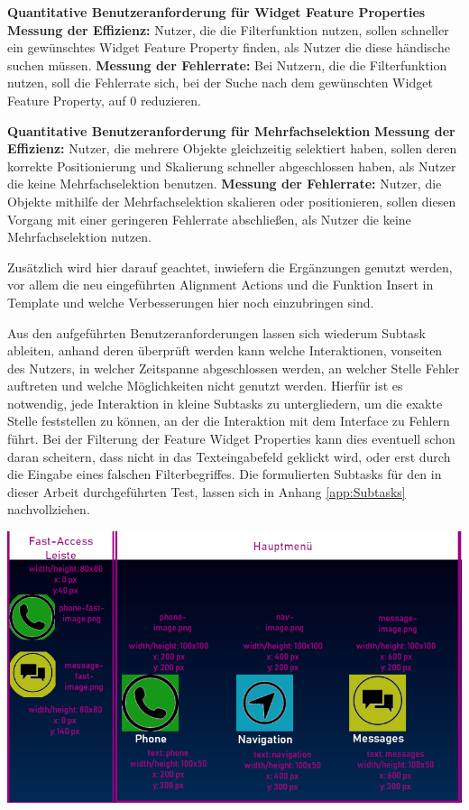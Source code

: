\textbf{Quantitative Benutzeranforderung für Widget Feature Properties} \newline
\textbf{Messung der Effizienz:}
Nutzer, die die Filterfunktion nutzen, sollen schneller ein gewünschtes Widget Feature Property finden, als Nutzer die diese händische suchen müssen. \newline
\textbf{Messung der Fehlerrate:}
Bei Nutzern, die die Filterfunktion nutzen, soll die Fehlerrate sich, bei der Suche nach dem gewünschten Widget Feature Property, auf 0 reduzieren.

\textbf{Quantitative Benutzeranforderung für Mehrfachselektion}\newline
\textbf{Messung der Effizienz:}
Nutzer, die mehrere Objekte gleichzeitig selektiert haben, sollen deren korrekte Positionierung  und Skalierung schneller abgeschlossen haben, als Nutzer die keine Mehrfachselektion benutzen.\newline
\textbf{Messung der Fehlerrate:}
Nutzer, die Objekte mithilfe der Mehrfachselektion skalieren oder positionieren, sollen diesen Vorgang mit einer geringeren Fehlerrate abschließen, als Nutzer die keine Mehrfachselektion nutzen.

Zusätzlich wird hier darauf geachtet, inwiefern die Ergänzungen genutzt werden, vor allem die neu eingeführten \glqq Alignment Actions\grqq{} und die Funktion \glqq Insert in Template\grqq{} und welche Verbesserungen hier noch einzubringen sind.

Aus den aufgeführten Benutzeranforderungen lassen sich wiederum Subtask ableiten, anhand deren überprüft werden kann welche Interaktionen, vonseiten des Nutzers, in welcher Zeitspanne abgeschlossen werden, an welcher Stelle Fehler auftreten und welche Möglichkeiten nicht genutzt werden.
Hierfür ist es notwendig, jede Interaktion in kleine Subtasks zu untergliedern, um die exakte Stelle feststellen zu können, an der die Interaktion mit dem Interface zu Fehlern führt.
Bei der Filterung der Feature Widget Properties kann dies eventuell schon daran scheitern, dass nicht in das Texteingabefeld geklickt wird, oder erst durch die Eingabe eines falschen Filterbegriffes.
Die formulierten Subtasks für den in dieser Arbeit durchgeführten Test, lassen sich in Anhang \ref{app:Subtasks} nachvollziehen.

\begin{center}
  \includegraphics[width=0.9\linewidth]{figures/Styleguide_Rahmen.png}
  \label{fig:Styleguide}
\end{center}

